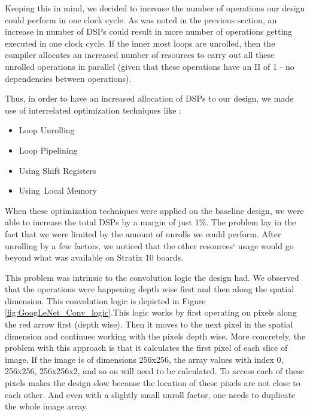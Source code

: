 Keeping this in mind, we decided to increase the number of operations our design could perform in one clock cycle. As was noted in the previous section, an increase in number of DSPs could result in more number of operations getting executed in one clock cycle. If the inner most loops are unrolled, then the compiler allocates an increased number of resources to carry out all these unrolled operations in parallel (given that these operations have an II of 1 - no dependencies between operations). 
 
 Thus, in order to have an increased allocation of DSPs to our design, we made use of interrelated  optimization techniques like : 
 \begin{itemize}
     \item Loop Unrolling
     \item Loop Pipelining
     \item Using Shift Registers
     \item Using Local Memory
\end{itemize}

When these optimization techniques were applied on the baseline design, we were able to increase the total DSPs by a margin of just 1\%. The problem lay in the fact that we were limited by the amount of unrolls we could perform. After unrolling by a few factors, we noticed that the other resources` usage would go beyond what was available on Stratix 10 boards.

This problem was intrinsic to the convolution logic the design had. We observed that the operations were happening depth wise first and then along the spatial dimension. This convolution logic is depicted in Figure \ref{fig:GoogLeNet_Conv_logic}.This logic works by first operating on pixels along the red arrow first (depth wise). Then it moves to the next pixel in the spatial dimension and continues working with the pixels depth wise. More concretely, the problem with this approach is that it calculates the first pixel of each slice of image. If the image is of dimensions 256x256, the array values with index 0, 256x256, 256x256x2, and so on will need to be calculated. To access each of these pixels makes the design slow because the location of these pixels are not close to each other. And even with a slightly small unroll factor, one needs to duplicate the whole image array.

